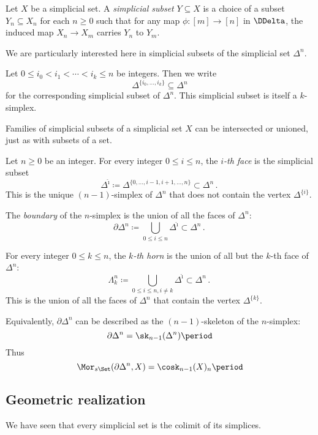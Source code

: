 \begin{definition}
  Let $X$ be a simplicial set.
  A \emph{simplicial subset} $Y \subseteq X$ is a choice of a subset $Y_n \subseteq X_n$ for each $n \geq 0$ such that for any map $\phi \colon [m] \to [n]$ in $\DDelta$, the induced map $X_n \to X_m$ carries $Y_n$ to $Y_m$.
\end{definition}

\noindent We are particularly interested here in simplicial subsets of the simplicial set $\Delta^n$.

\begin{notation}
  Let $0 \leq i_0 < i_1 < \cdots < i_k \leq n$ be integers.
  Then we write
  \[
    \Delta^{\{i_0, \dots, i_k\}} \subseteq \Delta^n
  \]
  for the corresponding simplicial subset of $\Delta^n$.
  This simplicial subset is itself a $k$-simplex.
\end{notation}

Families of simplicial subsets of a simplicial set $X$ can be intersected or unioned, just as with subsets of a set.

\begin{definition}
  Let $n \geq 0$ be an integer.
  For every integer $0 \leq i \leq n$, the \emph{$i$-th face} is the simplicial subset 
  \[
    \Delta^{\hat{\imath}} \coloneq \Delta^{\{0,\dots,i-1,i+1,\dots,n\}} \subset \Delta^n \period
  \]
  This is the unique $(n-1)$-simplex of $\Delta^n$ that does not contain the vertex $\Delta^{\{i\}}$.

  The \emph{boundary} of the $n$-simplex is the union of all the faces of $\Delta^n$:
  \[
    \partial \Delta^n \coloneq \bigcup_{0 \leq i \leq n} \Delta^{\hat{\imath}} \subset \Delta^n \period
  \]

  For every integer $0 \leq k \leq n$, the \emph{$k$-th horn} is the union of all but the $k$-th face of $\Delta^n$:
  \[
    \Lambda^n_k \coloneq \bigcup_{0 \leq i \leq n, i \neq k} \Delta^{\hat{\imath}} \subset \Delta^n \period
  \]
  This is the union of all the faces of $\Delta^n$ that contain the vertex $\Delta^{\{k\}}$. 
\end{definition}

Equivalently, $\partial \Delta^n$ can be described as the $(n-1)$-skeleton of the $n$-simplex:
\[
  \partial \Delta^n = \sk_{n-1}(\Delta^n) \period
\]
Thus
\[
  \Mor_{s\Set}(\partial\Delta^n, X) = \cosk_{n-1}(X)_n \period
\]

\subsection{Geometric realization}%
\label{sub:geometricrealization}
We have seen that every simplicial set is the colimit of its simplices.

